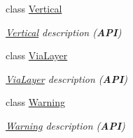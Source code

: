 \begin{DoxyCompactItemize}
class \mbox{\hyperlink{classHurricane_1_1Vertical}{Vertical}}
\begin{DoxyCompactList}\small\item\em \mbox{\hyperlink{classHurricane_1_1Vertical}{Vertical}} description ({\bfseries A\+PI}) \end{DoxyCompactList}\item 
class \mbox{\hyperlink{classHurricane_1_1ViaLayer}{Via\+Layer}}
\begin{DoxyCompactList}\small\item\em \mbox{\hyperlink{classHurricane_1_1ViaLayer}{Via\+Layer}} description ({\bfseries A\+PI}) \end{DoxyCompactList}\item 
class \mbox{\hyperlink{classHurricane_1_1Warning}{Warning}}
\begin{DoxyCompactList}\small\item\em \mbox{\hyperlink{classHurricane_1_1Warning}{Warning}} description ({\bfseries A\+PI}) \end{DoxyCompactList}\end{DoxyCompactItemize}
